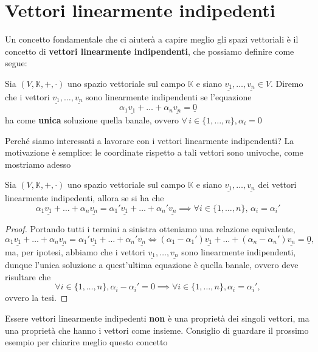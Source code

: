 \section{Vettori linearmente indipedenti}
Un concetto fondamentale che ci aiuterà a capire meglio gli spazi vettoriali è il concetto di \textbf{vettori linearmente indipendenti}, che possiamo definire come segue:
\begin{definition}
    Sia $(V, \mathbb{K}, +, \cdot)$ uno spazio vettoriale sul campo $\mathbb{K}$ e siano $\underline{v_1}, \ldots, \underline{v_n} \in V$. Diremo che i vettori $\underline{v_1}, \ldots, \underline{v_n}$ sono linearmente indipendenti se l'equazione
    $$
    \alpha_1 \underline{v_1} + \ldots + \alpha_n \underline{v_n} = \underline{0}
    $$
    ha come \textbf{unica} soluzione quella banale, ovvero $\forall \, i \in \{ 1, \ldots, n \}, \alpha_i = 0$
\end{definition}
Perché siamo interessati a lavorare con i vettori linearmente indipendenti? La motivazione è semplice: le coordinate rispetto a tali vettori sono univoche, come mostriamo adesso
\begin{prop}
    \label{prop:uniqueness_coordinates}
    Sia $(V, \mathbb{K}, +, \cdot)$ uno spazio vettoriale sul campo $\mathbb{K}$ e siano $\underline{v_1}, \ldots, \underline{v_n}$ dei vettori linearmente indipedenti, allora se si ha che
    $$
        \alpha_1 \underline{v_1} + \ldots + \alpha_n \underline{v_n} = \alpha_1' \underline{v_1} + \ldots + \alpha_n' \underline{v_n} \implies \forall i \in \{ 1,\ldots, n \}, \, \alpha_i = \alpha_i'
    $$
\end{prop}
\begin{proof}
    Portando tutti i termini a sinistra otteniamo una relazione equivalente,
    $$
        \alpha_1 \underline{v_1} + \ldots + \alpha_n \underline{v_n} = \alpha_1' \underline{v_1} + \ldots + \alpha_n' \underline{v_n} \iff (\alpha_1 - \alpha_1')\underline{v_1} + \ldots + (\alpha_n - \alpha_n') \underline{v_n} = \underline{0},
    $$
    ma, per ipotesi, abbiamo che i vettori $\underline{v_1}, \ldots, \underline{v_n}$ sono linearmente indipendenti, dunque l'unica soluzione a quest'ultima equazione è quella banale, ovvero deve risultare che
    $$
        \forall i \in \{ 1, \ldots, n \}, \alpha_i - \alpha_i' = 0 \implies \forall i \in \{ 1, \ldots, n \}, \alpha_i = \alpha_i',
    $$
    ovvero la tesi.
\end{proof}
\begin{remark}
    Essere vettori linearmente indipedenti \textbf{non} è una proprietà dei singoli vettori, ma una proprietà che hanno i vettori come insieme. Consiglio di guardare il prossimo esempio per chiarire meglio questo concetto
\end{remark}
